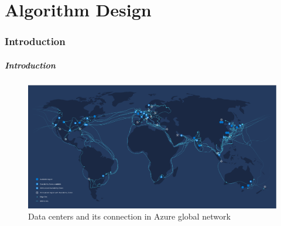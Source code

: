 


% 
\maketitle


\part{Algorithm Design}
\section{Introduction}
\begin{frame}
\frametitle{Introduction} %
\begin{figure}[h]
    \centering
    \includegraphics[height=0.6\textheight]{img/network.png}
    \caption{Data centers and its connection in Azure global network\cite{azure}}
    \label{fig:azure}
\end{figure}
\end{frame}


